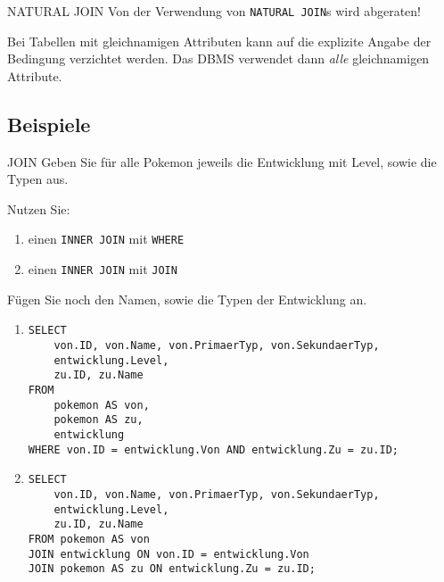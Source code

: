 \begin{bonus}{NATURAL JOIN}
    Von der Verwendung von \texttt{NATURAL JOIN}s wird abgeraten!

    Bei Tabellen mit gleichnamigen Attributen kann auf die explizite Angabe der Bedingung verzichtet werden.
    Das DBMS verwendet dann \emph{alle} gleichnamigen Attribute.
\end{bonus}

\subsection{Beispiele}

\begin{example}{JOIN}
    Geben Sie für alle Pokemon jeweils die Entwicklung mit Level, sowie die Typen aus.

    Nutzen Sie:
    \begin{enumerate}[label=\alph*)]
        \item einen \texttt{INNER JOIN} mit \texttt{WHERE}
        \item einen \texttt{INNER JOIN} mit \texttt{JOIN}
    \end{enumerate}

    Fügen Sie noch den Namen, sowie die Typen der Entwicklung an.

    \exampleseparator

    \begin{enumerate}[label=\alph*)]
        \item \begin{verbatim}
SELECT
    von.ID, von.Name, von.PrimaerTyp, von.SekundaerTyp,
    entwicklung.Level,
    zu.ID, zu.Name
FROM 
    pokemon AS von,
    pokemon AS zu,
    entwicklung
WHERE von.ID = entwicklung.Von AND entwicklung.Zu = zu.ID;
            \end{verbatim}
        \item \begin{verbatim}
SELECT
    von.ID, von.Name, von.PrimaerTyp, von.SekundaerTyp,
    entwicklung.Level,
    zu.ID, zu.Name
FROM pokemon AS von
JOIN entwicklung ON von.ID = entwicklung.Von
JOIN pokemon AS zu ON entwicklung.Zu = zu.ID;
            \end{verbatim}
    \end{enumerate}
    
    
\end{example}

